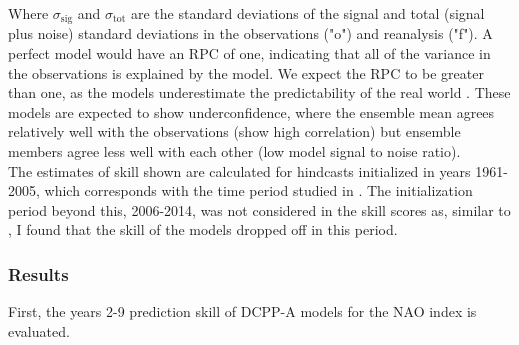 \documentclass{article}
\begin{document}
Where $\sigma_{\mathrm{sig}}$ and $\sigma_{\mathrm{tot}}$ are the standard deviations of the signal and total (signal plus noise) standard deviations in the observations ("o") and reanalysis ("f"). A perfect model would have an RPC of one, indicating that all of the variance in the observations is explained by the model. We expect the RPC to be greater than one, as the models underestimate the predictability of the real world \parencite{smith2020north}. These models are expected to show underconfidence, where the ensemble mean agrees relatively well with the observations (show high correlation) but ensemble members agree less well with each other (low model signal to noise ratio).\\

The estimates of skill shown are calculated for hindcasts initialized in years 1961-2005, which corresponds with the time period studied in \cite{smith2020north}. The initialization period beyond this, 2006-2014, was not considered in the skill scores as, similar to \cite{marcheggiani2023decadal}, I found that the skill of the models dropped off in this period.

\subsubsection*{Results}

First, the years 2-9 prediction skill of DCPP-A models for the NAO index is evaluated.\\
\end{document}

